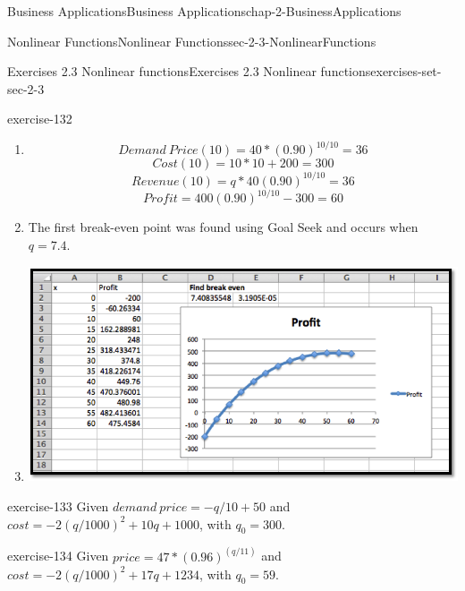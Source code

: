 \documentclass[oneside,10pt,]{book}
\numberwithin{equation}{section}
\begin{document}
\begin{chapterptx}{Business Applications}{}{Business Applications}{}{}{chap-2-BusinessApplications}
\begin{sectionptx}{Nonlinear Functions}{}{Nonlinear Functions}{}{}{sec-2-3-NonlinearFunctions}
\begin{exercises-subsection-numberless}{Exercises 2.3 Nonlinear functions}{}{Exercises 2.3 Nonlinear functions}{}{}{exercises-set-sec-2-3}
\begin{exercisegroup}
\begin{divisionexerciseeg}{17}{}{}{exercise-132}
\begin{enumerate}[label=(\alph*)]
%
\begin{equation*}
Profit=q*40(0.90)^{q/10}-10q-200
\end{equation*}
%
\item\hypertarget{li-261}{}%
\begin{equation*}
Demand\ Price(10)=40*(0.90)^{10/10}=36
\end{equation*}
%
\begin{equation*}
Cost(10)=10*10+200=300
\end{equation*}
%
\begin{equation*}
Revenue(10)=q*40(0.90)^{10/10}=36
\end{equation*}
%
\begin{equation*}
Profit=400(0.90)^{10/10}-300=60
\end{equation*}
%
\item\hypertarget{li-262}{}\hypertarget{p-875}{}%
The first break-even point was found using Goal Seek and occurs when \(q = 7.4\).%
\item\hypertarget{li-263}{}\leavevmode%
\begin{sidebyside}{1}{0}{0}{0}%
\begin{sbspanel}{1}%
\includegraphics[width=1\linewidth]{images/sec2-3-sol17a.png}
\end{sbspanel}%
\end{sidebyside}%
%
\end{enumerate}
\end{divisionexerciseeg}%
\begin{divisionexerciseeg}{18}{}{}{exercise-133}%
\hypertarget{p-876}{}%
Given \(demand\ price=- q/10+50\) and \(cost=-2(q/1000)^2+10 q+1000\), with \(q_0=300\).%
\end{divisionexerciseeg}%
\begin{divisionexerciseeg}{19}{}{}{exercise-134}%
\hypertarget{p-877}{}%
Given \(price=47*(0.96)^{(q/11)}\) and \(cost=-2(q/1000)^2+17 q+1234\), with \(q_0=59\).%

\end{divisionexerciseeg}
\end{exercisegroup}
\end{exercises-subsection-numberless}
\end{sectionptx}
\end{chapterptx}
\end{document}
